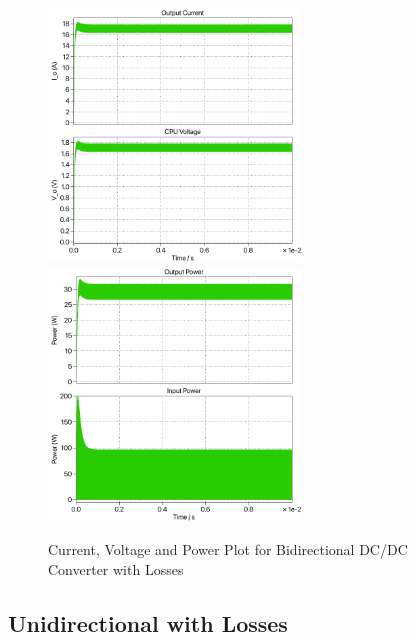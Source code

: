 \documentclass{article}
\begin{document}
\begin{figure}[H]
    \centering{}
    \includegraphics[width=0.6\textwidth]{img/loss-I-V-bidirectional.pdf}
    \includegraphics[width=0.6\textwidth]{img/loss-power-bidirectional.pdf}
    \label{fig:loss-bi-plots}
    \caption{Current, Voltage and Power Plot for Bidirectional DC/DC Converter with Losses}
\end{figure}

\subsection{Unidirectional with Losses}
\end{document}
